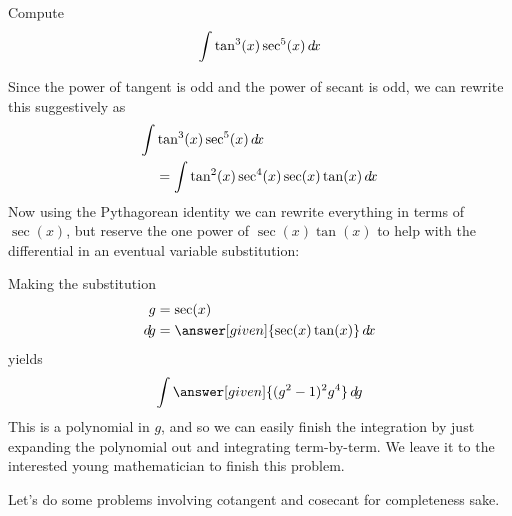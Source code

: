 \documentclass{ximera}
\begin{document}
\begin{example}
  Compute
  \[
  \int \tan^3(x) \sec^5(x) \mathop{}\!d\! x
  \]
  \begin{explanation}
    Since the power of tangent is odd and the power of secant is odd,
    we can rewrite this suggestively as
    \begin{align*}
    \int &\tan^3(x) \sec^5(x) \mathop{}\!d\! x \\
    &= \int\tan^2(x) \sec^4(x) \sec(x)\tan(x) \mathop{}\!d\! x
    \end{align*}
    Now using the Pythagorean identity we can rewrite everything in
    terms of $\sec(x)$, but reserve the one power of $\sec(x)\tan(x)$ to help
    with the differential in an eventual variable substitution:
    \begin{center}%
    \end{center}
    Making the substitution
    \begin{align*}
      g &= \sec(x)\\
      \d g &=\answer[given]{\sec(x)\tan(x)} \d x
    \end{align*}
    yields
    \[
    \int \answer[given]{(g^2-1)^2g^4} \d g
    \]
    This is a polynomial in $g$, and so we can easily finish the
    integration by just expanding the polynomial out and integrating
    term-by-term. We leave it to the interested young mathematician to
    finish this problem.
  \end{explanation}
\end{example}


Let's do some problems involving cotangent and cosecant for
completeness sake.
\end{document}
